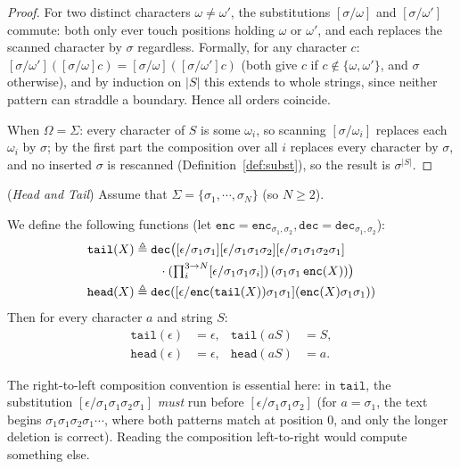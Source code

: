 \documentclass[runningheads,envcountsect]{llncs}
\renewenvironment{remark}
  {\rmfamily\trivlist\item[\hskip\labelsep{\itshape Remark.}]\ignorespaces}
  {\endtrivlist}
\begin{document}
\begin{proof}
    For two distinct characters $\omega \neq \omega'$, the substitutions $[\sigma/\omega]$ and $[\sigma/\omega']$ commute: both only ever touch positions holding $\omega$ or $\omega'$, and each replaces the scanned character by $\sigma$ regardless. Formally, for any character $c$: $[\sigma/\omega']([\sigma/\omega]c) = [\sigma/\omega]([\sigma/\omega']c)$ (both give $c$ if $c \notin \{\omega,\omega'\}$, and $\sigma$ otherwise), and by induction on $|S|$ this extends to whole strings, since neither pattern can straddle a boundary. Hence all orders coincide.

    When $\Omega = \Sigma$: every character of $S$ is some $\omega_i$, so scanning $[\sigma/\omega_i]$ replaces each $\omega_i$ by $\sigma$; by the first part the composition over all $i$ replaces every character by $\sigma$, and no inserted $\sigma$ is rescanned (Definition~\ref{def:subst}), so the result is $\sigma^{|S|}$.
\end{proof}

\begin{theorem}
    (\emph{Head and Tail})
    \label{thm:headtail}
    Assume that $\Sigma = \{\sigma_1,\cdots,\sigma_N\}$ (so $N \ge 2$).

    We define the following functions (let $\mathtt{enc}=\mathtt{enc}_{\sigma_1,\sigma_2},\mathtt{dec}=\mathtt{dec}_{\sigma_1,\sigma_2}$):
    \begin{align}
        \mathtt{tail}(X) & \triangleq \mathtt{dec}\big([\epsilon/\sigma_1\sigma_1][\epsilon/\sigma_1\sigma_1\sigma_2][\epsilon/\sigma_1\sigma_1\sigma_2\sigma_1] \notag\\
        & \qquad\cdot (\textstyle\prod_i^{3\rightarrow N}[\epsilon/\sigma_1\sigma_1\sigma_i])\,(\sigma_1\sigma_1\,\mathtt{enc}(X))\big) \\
        \mathtt{head}(X) & \triangleq \mathtt{dec}([\epsilon/\mathtt{enc}(\mathtt{tail}(X))\sigma_1\sigma_1](\mathtt{enc}(X)\sigma_1\sigma_1))
    \end{align}
    Then for every character $a$ and string $S$:
    \begin{align}
        \mathtt{tail}(\epsilon) & = \epsilon, & \mathtt{tail}(aS) & = S, \\
        \mathtt{head}(\epsilon) & = \epsilon, & \mathtt{head}(aS) & = a.
    \end{align}
\end{theorem}

\begin{remark}
    \label{rem:order}
    The right-to-left composition convention is essential here: in $\mathtt{tail}$, the substitution $[\epsilon/\sigma_1\sigma_1\sigma_2\sigma_1]$ \emph{must} run before $[\epsilon/\sigma_1\sigma_1\sigma_2]$ (for $a = \sigma_1$, the text begins $\sigma_1\sigma_1\sigma_2\sigma_1\cdots$, where both patterns match at position $0$, and only the longer deletion is correct). Reading the composition left-to-right would compute something else.
\end{remark}
\end{document}
